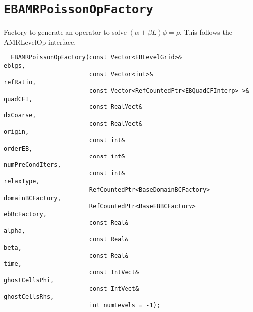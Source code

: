 \section{{\tt EBAMRPoissonOpFactory} }
   Factory to generate an operator to solve $(\alpha + \beta L)  \phi = \rho$.   
This follows the AMRLevelOp interface.
\begin{small}\begin{verbatim}
  EBAMRPoissonOpFactory(const Vector<EBLevelGrid>&                    eblgs,
                        const Vector<int>&                            refRatio,
                        const Vector<RefCountedPtr<EBQuadCFInterp> >& quadCFI,
                        const RealVect&                               dxCoarse,
                        const RealVect&                               origin,
                        const int&                                    orderEB,
                        const int&                                    numPreCondIters,
                        const int&                                    relaxType,
                        RefCountedPtr<BaseDomainBCFactory>            domainBCFactory,
                        RefCountedPtr<BaseEBBCFactory>                ebBcFactory,
                        const Real&                                   alpha,
                        const Real&                                   beta,
                        const Real&                                   time,
                        const IntVect&                                ghostCellsPhi,
                        const IntVect&                                ghostCellsRhs,
                        int numLevels = -1);                                                                     
\end{verbatim}\end{small} 
